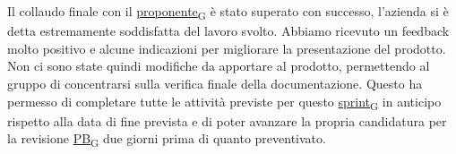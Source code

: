 Il collaudo finale con il \href{https://7last.github.io/docs/pb/documentazione-interna/glossario\#proponente}{proponente\textsubscript{G}} è stato superato con successo, l'azienda si è detta estremamente soddisfatta del lavoro svolto. Abbiamo ricevuto un feedback molto positivo e alcune indicazioni per migliorare la presentazione del prodotto. Non ci sono state quindi modifiche da apportare al prodotto, permettendo al gruppo di concentrarsi sulla verifica finale della documentazione. Questo ha permesso di completare tutte le attività previste per questo \href{https://7last.github.io/docs/pb/documentazione-interna/glossario\#sprint}{sprint\textsubscript{G}} in anticipo rispetto alla data di fine prevista e di poter avanzare la propria candidatura per la revisione \href{https://7last.github.io/docs/pb/documentazione-interna/glossario\#product-baseline}{PB\textsubscript{G}} due giorni prima di quanto preventivato.
